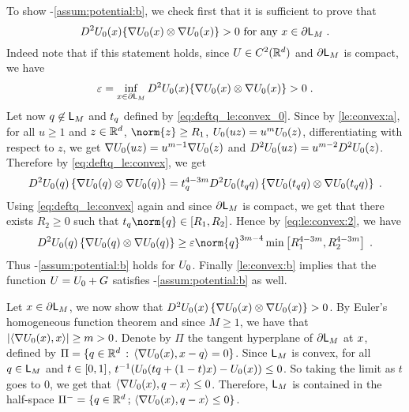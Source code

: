   To show -\ref{assum:potential:b}, we check first
  that it is sufficient to prove that
  \begin{equation}
D^2U_0(x)\lbrace \nabla
    U_0(x)\otimes \nabla U_0(x) \rbrace>0 \text{ for any } x \in \partial
  \mathsf{L}_M \;.
  \end{equation}
 Indeed note that if this statement holds, since $U \in C^2(\mathbb{R}^d)$
  and $\partial \mathsf{L}_M$ is compact, we have
  \begin{equation}
    \label{eq:le:convex:1}
\varepsilon =  \inf_{x \in \partial \mathsf{L}_M} D^2U_0(x)\lbrace \nabla
    U_0(x)\otimes \nabla U_0(x) \rbrace>0 \;.
  \end{equation}
Let now $q \not \in \mathsf{L}_M$ and $t_{q}$ defined by \eqref{eq:deftq_le:convex_0}.
Since by \ref{le:convex:a}, for all $u
  \geq 1$ and $z \in \mathbb{R}^d$, $\norm{z} \geq \Rexp$, $U_0(uz) = u^m U_0(z)$,
  differentiating with respect to $z$, we get $\nabla U_0(uz) = u^{m-1}
  \nabla U_0(z)$ and $D^2 U_0(uz) = u^{m-2} D^2U_0(z)$. Therefore by \eqref{eq:deftq_le:convex}, we get
 \begin{equation}
    \label{eq:le:convex:2}
   D^2U_0(q)\left\lbrace \nabla
  U_0(q)\otimes \nabla U_0(q) \right\rbrace = t_{q}^{4-3m} D^2U_0(t_{q} q)\left\lbrace \nabla
  U_0(t_{q} q )\otimes \nabla  U_0(t_{q} q) \right\rbrace \;.
 \end{equation}
Using \eqref{eq:deftq_le:convex} again and since $\partial \mathsf{L}_M$ is compact, we get that
there exists $R_2 \geq 0$ such that $t_{\q} \norm{q} \in \ccint{\Rexp,R_2}$. Hence by \eqref{eq:le:convex:2}, we have
\begin{equation}
   D^2\F_0(\q)\defEns{\nabla
  \F_0(\q)\otimes \nabla \F_0(\q)} \geq \varepsilon \norm{q}^{3m-4} \min\parentheseDeux{\Rexp^{4-3m},R_2^{4-3m}} \eqsp.
\end{equation}
Thus
 -\ref{assum:potential:b} holds for $U_0$.
Finally \ref{le:convex:b}
 implies that  the function $U=U_0+G$ satisfies
 -\ref{assum:potential:b} as well.


 Let $ x \in \partial \mathsf{L}_M$, we now show that $D^2U_0(x)\left\lbrace \nabla
 U_0(x)\otimes \nabla U_0(x) \right\rbrace>0$. By Euler's homogeneous function theorem and since $M \geq 1$, we have that
 $\left\vert \left\langle\nabla U_0(x),x \right\rangle \right\vert\geq m >0$.  Denote by $\Pi$ the tangent hyperplane
 of $\partial\mathsf{L}_M$ at $x$, defined by $\Pi = \{ q \in \mathbb{R}^d \, :
 \, \left\langle\nabla U_0(x) , x-q \right\rangle = 0\}$.  Since $\mathsf{L}_M$ is convex, for all $q \in
 \mathsf{L}_M$ and $t \in \left[0,1\right]$, $ t^{-1}( U_0(tq +(1-t)x)
 -U_0(x))\leq 0$. So taking the limit as $t$ goes to $0$, we get that
 $\left\langle\nabla U_0(x) , q-x \right\rangle \leq 0$. Therefore, $\mathsf{L}_M$ is
 contained in the half-space $\Pi^- = \{ q \in \mathbb{R}^d \, ; \, \left\langle\nabla
 U_0(x) , q-x \right\rangle \leq 0 \}$.

